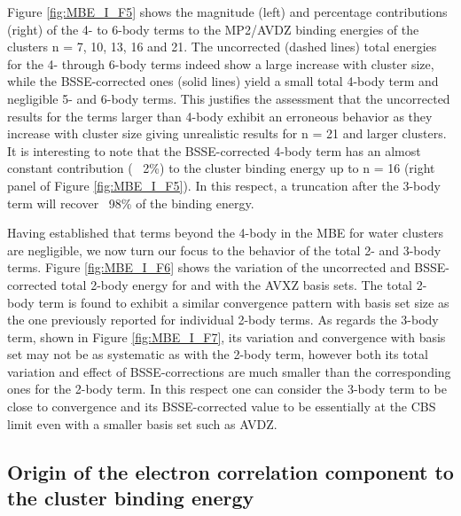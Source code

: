 \documentclass [11pt, proquest] {uwthesis}[2020/02/24]
\begin{document}
\par Figure \ref{fig:MBE_I_F5} shows the magnitude (left) and percentage contributions (right) of the 4- to 6-body terms to the MP2/AVDZ binding energies of the clusters n = 7, 10, 13, 16 and 21. The uncorrected (dashed lines) total energies for the 4- through 6-body terms indeed show a large increase with cluster size, while the BSSE-corrected ones (solid lines) yield a small total 4-body term and negligible 5- and 6-body terms. This justifies the assessment that the uncorrected results for the terms larger than 4-body exhibit an erroneous behavior as they increase with cluster size giving unrealistic results for n = 21 and larger clusters. It is interesting to note that the BSSE-corrected 4-body term has an almost constant contribution (~ 2\%) to the cluster binding energy up to n = 16 (right panel of Figure \ref{fig:MBE_I_F5}). In this respect, a truncation after the 3-body term will recover ~98\% of the binding energy.

\par Having established that terms beyond the 4-body in the MBE for water clusters are negligible, we now turn our focus to the behavior of the total 2- and 3-body terms. Figure \ref{fig:MBE_I_F6} shows the variation of the uncorrected and BSSE-corrected total 2-body energy for  and  with the AVXZ basis sets. The total 2-body term is found to exhibit a similar convergence pattern with basis set size as the one previously reported for individual 2-body terms.\autocite{xantheas_ab_1994,dunning_road_2000,miliordos_n_2015,miliordos_benchmark_2014} As regards the 3-body term, shown in Figure \ref{fig:MBE_I_F7}, its variation and convergence with basis set may not be as systematic as with the 2-body term, however both its total variation and effect of BSSE-corrections are much smaller than the corresponding ones for the 2-body term. In this respect one can consider the 3-body term to be close to convergence and its BSSE-corrected value to be essentially at the CBS limit even with a smaller basis set such as AVDZ.

\subsection{Origin of the electron correlation component to the cluster binding energy}
\end{document}
